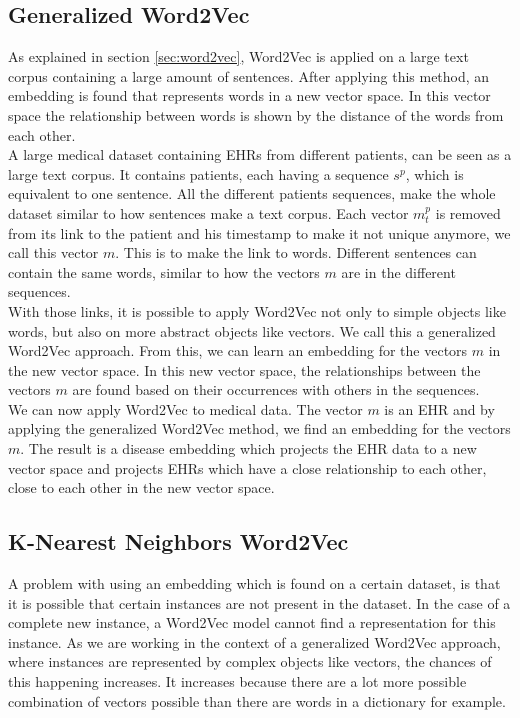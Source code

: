 \subsection{Generalized Word2Vec}

As explained in section \ref{sec:word2vec}, Word2Vec is applied on a large text corpus containing a large amount of sentences. After applying this method, an embedding is found that represents words in a new vector space. In this vector space the relationship between words is shown by the distance of the words from each other. \\

A large medical dataset containing EHRs from different patients, can be seen as a large text corpus. It contains patients, each having a sequence $s^p$, which is equivalent to one sentence. All the different patients sequences, make the whole dataset similar to how sentences make a text corpus. Each vector $m^p_t$ is removed from its link to the patient and his timestamp to make it not unique anymore, we call this vector $m$. This is to make the link to words. Different sentences can contain the same words, similar to how the vectors $m$ are in the different sequences. \\

With those links, it is possible to apply Word2Vec not only to simple objects like words, but also on more abstract objects like vectors. We call this a generalized Word2Vec approach. From this, we can learn an embedding for the vectors $m$ in the new vector space. In this new vector space, the relationships between the vectors $m$ are found based on their occurrences with others in the sequences. \\

We can now apply Word2Vec to medical data. The vector $m$ is an EHR and by applying the generalized Word2Vec method, we find an embedding for the vectors $m$. The result is a disease embedding which projects the EHR data to a new vector space and projects EHRs which have a close relationship to each other, close to each other in the new vector space.


\subsection{K-Nearest Neighbors Word2Vec}

A problem with using an embedding which is found on a certain dataset, is that it is possible that certain instances are not present in the dataset. In the case of a complete new instance, a Word2Vec model cannot find a representation for this instance. As we are working in the context of a generalized Word2Vec approach, where instances are represented by complex objects like vectors, the chances of this happening increases. It increases because there are a lot more possible combination of vectors possible than there are words in a dictionary for example. \\

